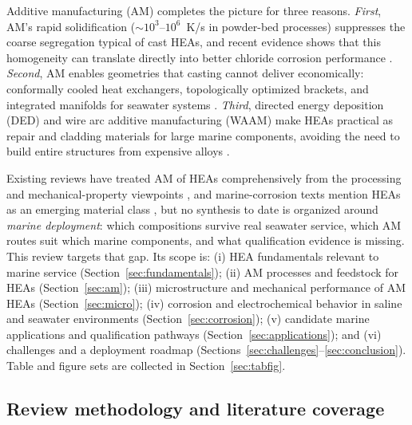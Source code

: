 Additive manufacturing (AM) completes the picture for three reasons. \emph{First}, AM's rapid solidification ($\sim10^{3}$--$10^{6}$~K/s in powder-bed processes) suppresses the coarse segregation typical of cast HEAs, and recent evidence shows that this homogeneity can translate directly into better chloride corrosion performance \cite{slm_ehea_2025,han2025}. \emph{Second}, AM enables geometries that casting cannot deliver economically: conformally cooled heat exchangers, topologically optimized brackets, and integrated manifolds for seawater systems \cite{cagirici2024}. \emph{Third}, directed energy deposition (DED) and wire arc additive manufacturing (WAAM) make HEAs practical as repair and cladding materials for large marine components, avoiding the need to build entire structures from expensive alloys \cite{jiang2019clad,raultaiwade2021}.

Existing reviews have treated AM of HEAs comprehensively from the processing and mechanical-property viewpoints \cite{cagirici2024,han2025,abdullah2024rhea}, and marine-corrosion texts mention HEAs as an emerging material class \cite{nass2025marine}, but no synthesis to date is organized around \emph{marine deployment}: which compositions survive real seawater service, which AM routes suit which marine components, and what qualification evidence is missing. This review targets that gap. Its scope is: (i) HEA fundamentals relevant to marine service (Section~\ref{sec:fundamentals}); (ii) AM processes and feedstock for HEAs (Section~\ref{sec:am}); (iii) microstructure and mechanical performance of AM HEAs (Section~\ref{sec:micro}); (iv) corrosion and electrochemical behavior in saline and seawater environments (Section~\ref{sec:corrosion}); (v) candidate marine applications and qualification pathways (Section~\ref{sec:applications}); and (vi) challenges and a deployment roadmap (Sections~\ref{sec:challenges}--\ref{sec:conclusion}). Table and figure sets are collected in Section~\ref{sec:tabfig}.

\subsection{Review methodology and literature coverage}
\label{sec:method}

